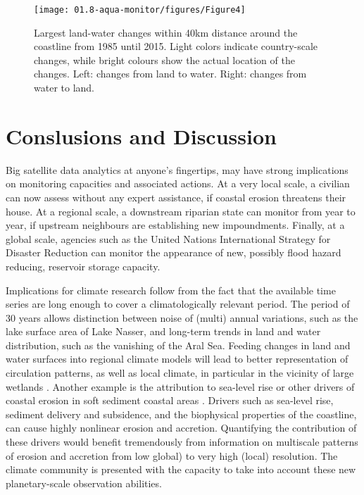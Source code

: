 \begin{figure}
	\centering
	\texttt{[image: 01.8-aqua-monitor/figures/Figure4]}
	\caption{Largest land-water changes within 40km distance around the coastline from 1985 until 2015. Light colors indicate country-scale changes, while bright colours show the actual location of the changes. Left: changes from land to water. Right: changes from water to land.}
	\label{fig:am-coasline}
\end{figure}

\section{Conslusions and Discussion}
Big satellite data analytics at anyone’s fingertips, may have strong implications on monitoring capacities and associated actions. At a very local scale, a civilian can now assess without any expert assistance, if coastal erosion threatens their house. At a regional scale, a downstream riparian state can monitor from year to year, if upstream neighbours are establishing new impoundments. Finally, at a global scale, agencies such as the United Nations International Strategy for Disaster Reduction can monitor the appearance of new, possibly flood hazard reducing, reservoir storage capacity.

Implications for climate research follow from the fact that the available time series are long enough to cover a climatologically relevant period. The period of 30 years allows distinction between noise of (multi)
annual variations, such as the lake surface area of Lake Nasser, and long-term trends in land and water distribution, such as the vanishing of the Aral Sea. Feeding changes in land and water surfaces into regional climate models will lead to better representation of circulation patterns, as well as local climate, in particular in the vicinity of large wetlands \citep{Mohamed2005}. Another example is the attribution to sea-level rise or other drivers of coastal erosion in soft sediment coastal areas \citep{Barros2015}. Drivers such as sea-level rise, sediment delivery and subsidence, and the biophysical properties of the coastline, can cause highly nonlinear erosion and accretion. Quantifying the contribution of these drivers would benefit tremendously from information on multiscale patterns of erosion and accretion from low global) to very high (local) resolution. The climate community is presented with the capacity to take into account these new planetary-scale observation abilities.
